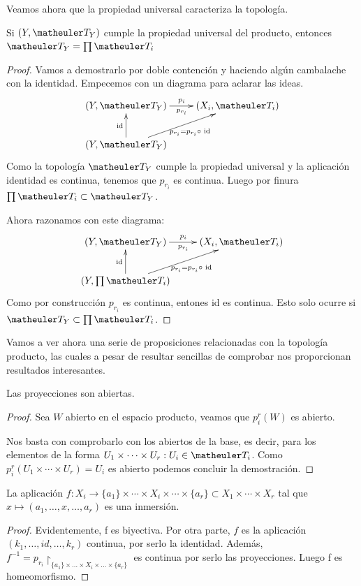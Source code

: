 Veamos ahora que la propiedad universal caracteriza la topología.

\begin{prop}
	Si $(Y,\T_Y)$ cumple la propiedad universal del producto, entonces $\T_Y = \prod\T_i $
\end{prop}
\begin{proof}
	Vamos a demostrarlo por doble contención y haciendo algún cambalache con la identidad.
	Empecemos con un diagrama para aclarar las ideas.
	\[\xymatrix{
		(Y,\T_Y) \ar[r]_{p_{r_i}}^{p_i} & 
		(X_i,\T_i) \\
		(Y,\T_Y) \ar[u]^{\text{id}} \ar[ru]_{p_{r_i} = p_{r_i} \circ \text{ id}} &
	}\]
	Como la topología $\T_Y$ cumple la propiedad universal y la aplicación identidad es continua, tenemos que $p_{r_i}$ es continua. Luego por finura $ \prod\T_i \subset \T_Y$.
	
	Ahora razonamos con este diagrama:
	\[\xymatrix{
		(Y,\T_Y) \ar[r]_{p_{r_i}}^{p_i} & 
		(X_i,\T_i) \\
		(Y,\prod\T_i) \ar[u]^{\text{id}} \ar[ru]_{p_{r_i} = p_{r_i} \circ \text{ id}} &
	}\]	
	Como por construcción $p_{r_i}$ es continua, entones id es continua. Esto solo ocurre si $\T_Y \subset \prod\T_i$. 	
\end{proof}

Vamos a ver ahora una serie de proposiciones relacionadas con la topología producto, las cuales a pesar de resultar sencillas de comprobar nos proporcionan resultados interesantes.

\begin{prop}
	Las proyecciones son abiertas.
	
	\begin{proof}
		Sea $W$ abierto en el espacio producto, veamos que $p_i^r(W)$ es abierto.
		
		Nos basta con comprobarlo con los abiertos de la base, es decir, para los elementos de la forma $ U_1\times\cdots\times U_r : U_i\in \T_i$.  Como  $p_i^r(U_1\times\cdots\times U_r)=U_i$ es abierto podemos concluir la demostración.
	\end{proof}
\end{prop}


\begin{prop}
	La aplicación $f : X_i\to\{a_1\}\times\cdots\times X_i\times\cdots\times \{a_r\}\subset X_1\times\cdots\times X_r$ tal que $x\mapsto (a_1,\dots,x,\dots,a_r)$ es una inmersión.
	
	\begin{proof}
		Evidentemente, f es biyectiva. Por otra parte, $f$ es la aplicación $(k_1,\dots,id,\dots,k_r)$ continua, por serlo la identidad.
		Además, $f^{-1} = p_{r_i}\restriction_{\{a_1\}\times\dots\times X_i \times \dots \times\{a_r\}}$ es continua por serlo las proyecciones. Luego f es homeomorfismo.
	\end{proof}
\end{prop}

